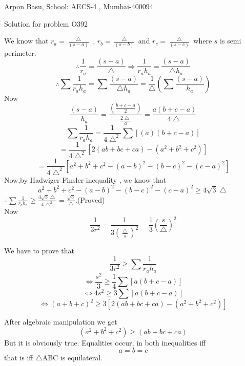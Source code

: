 \documentclass[10pt,a4paper]{extarticle}
\begin{document}
\begin{center}


Arpon Basu, School: AECS-4 , Mumbai-400094

Solution for problem O392 
\end{center}







We know that $r_{a}=\frac{\bigtriangleup}{(s-a)}$ , $r_{b}=\frac{\bigtriangleup}{(s-b)}$ and $r_{c}=\frac{\bigtriangleup}{(s-c)}$ where $s$ is semi perimeter.\\
$$\therefore \frac{1}{r_{a}}=\frac{(s-a)}{\bigtriangleup} \Rightarrow \frac{1}{r_{a}h_{a}}=\frac{(s-a)}{{\bigtriangleup}{h_{a}}}$$ 
$$\therefore \sum{ \frac{1}{r_{a}h_{a}}}=\sum \frac{(s-a)}{{\bigtriangleup}{h_{a}}}=\frac{1}{\bigtriangleup}(\sum \frac{(s-a)}{h_{a}})$$
Now $$\frac{(s-a)}{{h_{a}}}=\frac{(\frac{b+c-a}{2})}{\frac{2 \bigtriangleup}{a}}=\frac{a(b+c-a)}{4 \bigtriangleup}$$ 
$$ \sum \frac{1}{r_{a}h_{a}}= \frac{1}{4{\bigtriangleup}^{2}} \sum  [(a)(b+c-a)]$$
$$= \frac{1}{4{\bigtriangleup}^{2}}[2(ab+bc+ca)-(a^{2}+b^{2}+c^{2})]$$
$$=\frac{1}{4{\bigtriangleup}^{2}}[a^{2}+b^{2}+c^{2}-(a-b)^{2}-(b-c)^{2} - (c-a)^{2}]$$ 
Now,by Hadwiger Finsler inequality , we know that 
$$a^{2}+b^{2}+c^{2}-(a-b)^{2} -(b-c)^{2} -(c-a)^{2} \geq 4\sqrt{3}\bigtriangleup$$ 
$\therefore  \sum \frac{1}{r_{a}h_{a}} \geq \frac{4\sqrt{3}\bigtriangleup}{4{\bigtriangleup}^{2}}=\frac{\sqrt{3}}{\bigtriangleup}$.(Proved)\\
 
Now $$\frac{1}{3r^{2}}=\frac{1}{3({\frac{\bigtriangleup}{s}})^{2}}=\frac{1}{3} (\frac{s}{\bigtriangleup})^2$$ 

We have to prove that $$ \frac{1}{3r^{2}} \geq \sum \frac{1}{r_{a}h_{a}}$$
$$  \Longleftrightarrow \frac{s^2}{3} \geq \frac{1}{4} \sum{[a(b+c-a)]}$$
$$ \Longleftrightarrow 4s^{2} \geq 3 \sum {[a(b+c-a)]} $$
$$\Longleftrightarrow (a+b+c)^{2} \geq 3[2(ab+bc+ca)-(a^2 + b^2 + c^2)]  $$

After algebraic manipulation we get $$ (a^2 +b^2 +c^2) \geq (ab+bc+ca) $$ But it is obviously true. Equalities occur, in both inequalities iff $$a=b=c $$ that is iff $\bigtriangleup$ABC is equilateral.
\end{document}
